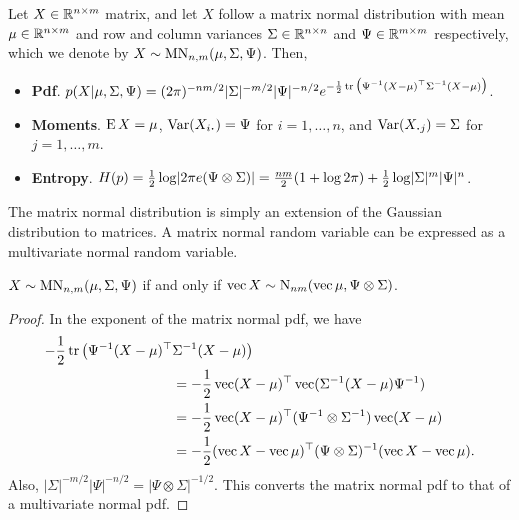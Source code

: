 \begin{definition}
  Let $X\in\bbR^{n \times m}$ matrix, and let $X$ follow a matrix normal distribution with mean $\mu\in\bbR^{n \times m}$ and row and column variances $\Sigma \in \bbR^{n \times n}$ and $\Psi \in \bbR^{m \times m}$ respectively, which we denote by $X\sim\MN_{n,m}(\mu,\Sigma,\Psi)$.
  Then,
  \begin{itemize}
    \item \textbf{Pdf}. $p(X|\mu,\Sigma,\Psi) = (2\pi)^{-nm/2}|\Sigma|^{-m/2}|\Psi|^{-n/2} e^{-\half \tr \big(\Psi^{-1}(X-\mu)^\top\Sigma^{-1}(X-\mu)\big)}$.
    \item \textbf{Moments}. $\E X=\mu$, $\Var(X_{i \bigcdot }) = \Psi$ for $i=1,\dots,n$, and $\Var(X_{\bigcdot j}) = \Sigma$ for $j=1,\dots,m$. 
    \item \textbf{Entropy}. $H(p) = \half \log \abs{2\pi e (\Psi \otimes \Sigma)} = \half[nm](1 + \log 2\pi) + \half\log\abs{\Sigma}^m\abs{\Psi}^n$.
  \end{itemize}
\end{definition}

The matrix normal distribution is simply an extension of the Gaussian distribution to matrices.
A matrix normal random variable can be expressed as a multivariate normal random variable.

\begin{lemma}
  $X\sim\MN_{n,m}(\mu,\Sigma,\Psi)$ if and only if $\vecc X\sim \N_{nm}(\vecc\mu,\Psi \otimes \Sigma)$.
\end{lemma}

\begin{proof}
  In the exponent of the matrix normal pdf, we have
  \begin{align*}
    -\half \tr \big(\Psi^{-1}(X-\mu)^\top &\Sigma^{-1}(X-\mu)\big) \\
    &= -\half \vecc(X-\mu)^\top \vecc(\Sigma^{-1}(X-\mu)\Psi^{-1}) \\
    &= -\half \vecc(X-\mu)^\top (\Psi^{-1} \otimes \Sigma^{-1}) \vecc(X-\mu) \\
    &= -\half (\vecc X- \vecc \mu)^\top (\Psi \otimes \Sigma)^{-1} (\vecc X- \vecc \mu).     
  \end{align*} 
  Also, $|\Sigma|^{-m/2}|\Psi|^{-n/2} = |\Psi \otimes \Sigma|^{-1/2}$.
  This converts the matrix normal pdf to that of a multivariate normal pdf.
\end{proof}

